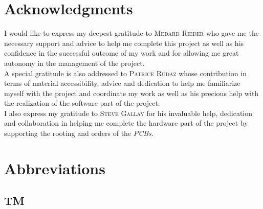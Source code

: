 \documentclass[Report.tex]{subfiles}
\begin{document}
\chapter*{Acknowledgments}


\setcounter{page}{1}

I would like to express my deepest gratitude to \textsc{Medard Rieder} who gave me the necessary support and advice to help me complete this project as well as his confidence in the successful outcome of my work and for allowing me great autonomy in the management of the project.\\

A special gratitude is also addressed to \textsc{Patrice Rudaz} whose contribution in terms of material accessibility, advice and dedication to help me familiarize myself with the project and coordinate my work as well as his precious help with the realization of the software part of the project.\\

I also express my gratitude to \textsc{Steve Gallay} for his invaluable help, dedication and collaboration in helping me complete the hardware part of the project by supporting the rooting and orders of the \textit{PCBs}.

\newpage

\chapter*{Abbreviations}

\section*{TM}
\end{document}
